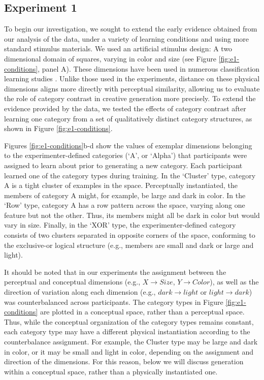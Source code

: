 \documentclass[12pt]{article}
\begin{document}
\begin{flushleft}
\section{Experiment 1}

To begin our investigation, we sought to extend the early evidence obtained from our analysis of the \cite{jern2013probabilistic} data, under a variety of learning conditions and using more standard stimulus materials. We used an artificial stimulus design: A two dimensional domain of squares, varying in color and size (see Figure \ref{fig:e1-conditions}, panel A). These dimensions have been used in numerous classification learning studies \cite[e.g.,][]{conaway2016similar,conaway2016generalization,shepard1961learning,nosofsky1994comparing}. Unlike those used in the \cite{jern2013probabilistic} experiments, distance on these physical dimensions aligns more directly with perceptual similarity, allowing us to evaluate the role of category contrast in creative generation more precisely. To extend the evidence provided by the \cite{jern2013probabilistic} data, we tested the effects of category contrast after learning one category from a set of qualitatively distinct category structures, as shown in Figure \ref{fig:e1-conditions}. 

Figures \ref{fig:e1-conditions}b-d show the values of exemplar dimensions belonging to the experimenter-defined categories (`A', or `Alpha') that participants were assigned to learn about prior to generating a new category. Each participant learned one of the category types during training. In the `Cluster' type, category A is a tight cluster of examples in the space. Perceptually instantiated, the members of category A might, for example, be large and dark in color. In the `Row' type, category A has a row pattern across the space, varying along one feature but not the other. Thus, its members might all be dark in color but would vary in size. Finally, in the `XOR' type, the experimenter-defined category consists of two clusters separated in opposite corners of the space, conforming to the exclusive-or logical structure (e.g., members are small and dark or large and light). 

It should be noted that in our experiments the assignment between the perceptual and conceptual dimensions (e.g., $X \rightarrow Size$, $Y \rightarrow Color$), as well as the direction of variation along each dimension (e.g., $dark \rightarrow light$ or $light \rightarrow dark$) was counterbalanced across participants. The category types in Figure \ref{fig:e1-conditions} are plotted in a conceptual space, rather than a perceptual space. Thus, while the conceptual organization of the category types remains constant, each category type may have a different physical instantiation according to the counterbalance assignment. For example, the Cluster type  may be large and dark in color, or it may be small and light in color, depending on the assignment and direction of the dimensions. For this reason, below we will discuss generation within a conceptual space, rather than a physically instantiated one.


\end{flushleft}
\end{document}
